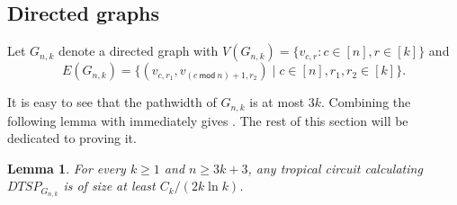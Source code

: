 \documentclass[11pt,a4paper]{article}
\newtheorem{lemma}{Lemma}[section]
\renewcommand{\mod}{\ \mathsf{mod}\ }
\begin{document}
\subsection{Directed graphs}

Let $G_{n, k}$ denote a directed graph with
$
V(G_{n, k}) = \{ v_{c, r} \colon c \in [n], r \in [k] \}
$
and
$$
E(G_{n, k}) = \{ (v_{c, r_1}, v_{(c \mod n) + 1, r_2}) \mid c \in [n], r_1, r_2 \in [k] \}.
$$


It is easy to see that the pathwidth of $G_{n, k}$ is at most $3k$.
Combining the following lemma with  immediately gives . The rest of this section will be dedicated to proving it.

\begin{lemma}\label{lem:main_dtsp}
    For every $k \geq 1$ and $n \geq 3k + 3$, any tropical circuit calculating $DTSP_{G_{n, k}}$ is of size at least $C_k / (2k \ln k)$.
\end{lemma}
\end{document}
